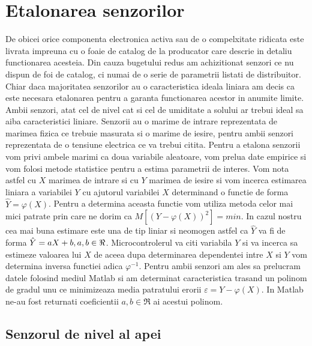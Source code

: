\documentclass[12pt]{article}
\begin{document}
\section{Etalonarea senzorilor}
\hspace{8 mm} De obicei orice componenta electronica activa sau de o compelxitate ridicata este livrata impreuna cu o foaie de catalog de la producator care descrie in detaliu functionarea acesteia. Din cauza bugetului redus am achizitionat senzori ce nu dispun de foi de catalog, ci numai de o serie de parametrii listati de distribuitor. Chiar daca majoritatea senzorilor au o caracteristica ideala liniara am decis ca este necesara etalonarea pentru a garanta functionarea acestor in anumite limite. Ambii senzori, atat cel de nivel cat si cel de umiditate a solului ar trebui ideal sa aiba caracteristici liniare. Senzorii au o marime de intrare reprezentata de marimea fizica ce trebuie masurata si o marime de iesire, pentru ambii senzori reprezentata de o tensiune electrica ce va trebui citita. Pentru a etalona senzorii vom privi ambele marimi ca doua variabile aleatoare, vom prelua date empirice si vom folosi metode statistice pentru a estima parametrii de interes. Vom nota astfel cu $X$ marimea de intrare si cu $Y$ marimea de iesire si vom incerca estimarea liniara a variabilei $Y$ cu ajutorul variabilei $X$ determinand o functie de forma $\hat{Y} = \varphi(X)$. Pentru a determina aceasta functie vom utiliza metoda celor mai mici patrate prin care ne dorim ca $M[(Y-\varphi(X))^2] = min$. In cazul nostru cea mai buna estimare este una de tip liniar si neomogen astfel ca $\hat{Y}$ va fi de forma $\hat{Y} = aX + b, \\ a,b \in \Re$. Microcontrolerul va citi variabila $Y$ si va incerca sa estimeze valoarea lui $X$ de aceea dupa determinarea dependentei intre $X$ si $Y$ vom determina inversa functiei adica $\varphi^{-1}$. Pentru ambii senzori am ales sa prelucram datele folosind mediul Matlab si am determinat caracteristica trasand un polinom de gradul unu ce minimizeaza media patratului erorii $\varepsilon = Y-\varphi(X)$. In Matlab ne-au fost returnati coeficientii $a,b \in \Re$ ai acestui polinom.

\subsection{Senzorul de nivel al apei}
\end{document}
